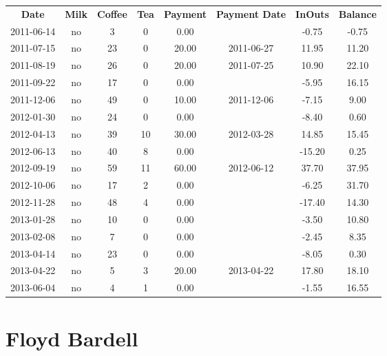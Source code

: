 \begin{center}
\begin{tabular}{cccccccc}
\textbf{Date} & \textbf{Milk} & \textbf{Coffee} & \textbf{Tea} & \textbf{Payment} & \textbf{Payment Date} & \textbf{InOuts} & \textbf{Balance} \\
2011-06-14 & no &  3 &  0 &  0.00 &  &  -0.75 & -0.75\\ 
2011-07-15 & no & 23 &  0 & 20.00 & 2011-06-27 &  11.95 & 11.20\\ 
2011-08-19 & no & 26 &  0 & 20.00 & 2011-07-25 &  10.90 & 22.10\\ 
2011-09-22 & no & 17 &  0 &  0.00 &  &  -5.95 & 16.15\\ 
2011-12-06 & no & 49 &  0 & 10.00 & 2011-12-06 &  -7.15 &  9.00\\ 
2012-01-30 & no & 24 &  0 &  0.00 &  &  -8.40 &  0.60\\ 
2012-04-13 & no & 39 & 10 & 30.00 & 2012-03-28 &  14.85 & 15.45\\ 
2012-06-13 & no & 40 &  8 &  0.00 &  & -15.20 &  0.25\\ 
2012-09-19 & no & 59 & 11 & 60.00 & 2012-06-12 &  37.70 & 37.95\\ 
2012-10-06 & no & 17 &  2 &  0.00 &  &  -6.25 & 31.70\\ 
2012-11-28 & no & 48 &  4 &  0.00 &  & -17.40 & 14.30\\ 
2013-01-28 & no & 10 &  0 &  0.00 &  &  -3.50 & 10.80\\ 
2013-02-08 & no &  7 &  0 &  0.00 &  &  -2.45 &  8.35\\ 
2013-04-14 & no & 23 &  0 &  0.00 &  &  -8.05 &  0.30\\ 
2013-04-22 & no &  5 &  3 & 20.00 & 2013-04-22 &  17.80 & 18.10\\ 
2013-06-04 & no &  4 &  1 &  0.00 &  &  -1.55 & 16.55
\end{tabular}
\end{center}

\section{Floyd Bardell}


